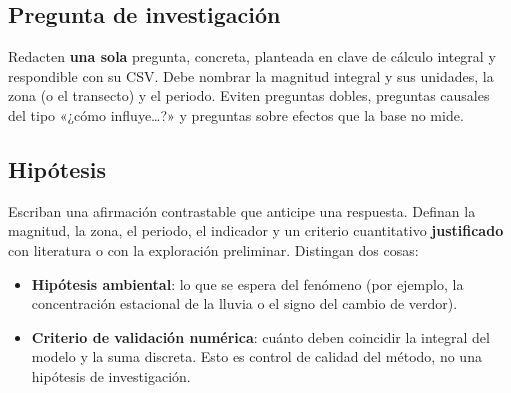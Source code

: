 \documentclass[11pt,a4paper]{article}
\begin{document}
\subsection*{Pregunta de investigación}
Redacten \textbf{una sola} pregunta, concreta, planteada en clave de cálculo integral y respondible con su CSV. Debe nombrar la magnitud integral y sus unidades, la zona (o el transecto) y el periodo. Eviten preguntas dobles, preguntas causales del tipo «¿cómo influye…?» y preguntas sobre efectos que la base no mide.

\subsection*{Hipótesis}
Escriban una afirmación contrastable que anticipe una respuesta. Definan la magnitud, la zona, el periodo, el indicador y un criterio cuantitativo \textbf{justificado} con literatura o con la exploración preliminar. Distingan dos cosas:
\begin{itemize}
  \item \textbf{Hipótesis ambiental}: lo que se espera del fenómeno (por ejemplo, la concentración estacional de la lluvia o el signo del cambio de verdor).
  \item \textbf{Criterio de validación numérica}: cuánto deben coincidir la integral del modelo y la suma discreta. Esto es control de calidad del método, no una hipótesis de investigación.
\end{itemize}
\end{document}
